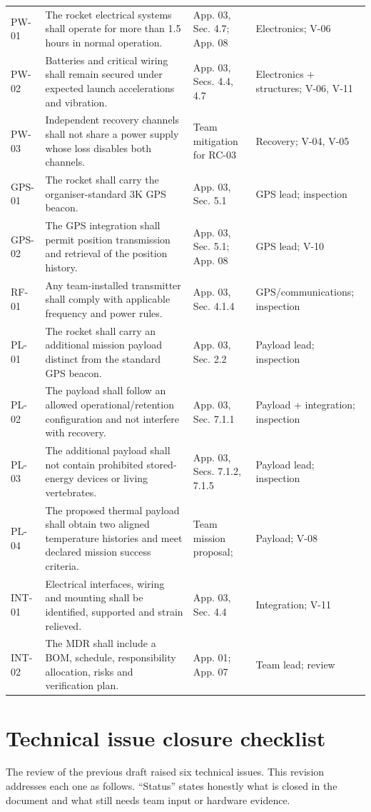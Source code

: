 \begin{longtable}{@{}L{12mm}L{71mm}L{33mm}L{34mm}@{}}
PW-01 & The rocket electrical systems shall operate for more than 1.5 hours in normal operation. & App. 03, Sec. 4.7; App. 08 & Electronics; V-06\\
PW-02 & Batteries and critical wiring shall remain secured under expected launch accelerations and vibration. & App. 03, Secs. 4.4, 4.7 & Electronics + structures; V-06, V-11\\
PW-03 & Independent recovery channels shall not share a power supply whose loss disables both channels. & Team mitigation for RC-03 & Recovery; V-04, V-05\\
GPS-01 & The rocket shall carry the organiser-standard 3K GPS beacon. & App. 03, Sec. 5.1 & GPS lead; inspection\\
GPS-02 & The GPS integration shall permit position transmission and retrieval of the position history. & App. 03, Sec. 5.1; App. 08 & GPS lead; V-10\\
RF-01 & Any team-installed transmitter shall comply with applicable frequency and power rules. & App. 03, Sec. 4.1.4 & GPS/communications; inspection\\
PL-01 & The rocket shall carry an additional mission payload distinct from the standard GPS beacon. & App. 03, Sec. 2.2 & Payload lead; inspection\\
PL-02 & The payload shall follow an allowed operational/retention configuration and not interfere with recovery. & App. 03, Sec. 7.1.1 & Payload + integration; inspection\\
PL-03 & The additional payload shall not contain prohibited stored-energy devices or living vertebrates. & App. 03, Secs. 7.1.2, 7.1.5 & Payload lead; inspection\\
PL-04 & The proposed thermal payload shall obtain two aligned temperature histories and meet declared mission success criteria. & Team mission proposal; \cite{rtc2027app07} & Payload; V-08\\
INT-01 & Electrical interfaces, wiring and mounting shall be identified, supported and strain relieved. & App. 03, Sec. 4.4 & Integration; V-11\\
INT-02 & The MDR shall include a BOM, schedule, responsibility allocation, risks and verification plan. & App. 01; App. 07 \cite{rtc2027app01,rtc2027app07} & Team lead; review\\
\end{longtable}
\normalsize

\section{Technical issue closure checklist}
The review of the previous draft raised six technical issues. This revision addresses each one as follows. ``Status'' states honestly what is closed in the document and what still needs team input or hardware evidence.

